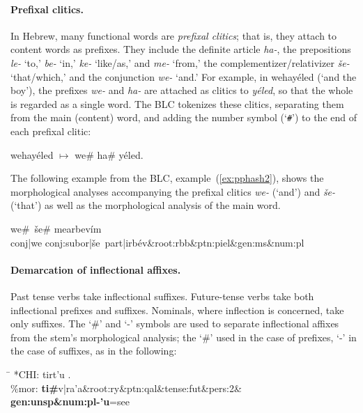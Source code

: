 \paragraph{Prefixal clitics.} In Hebrew, many functional words are 
\textit{prefixal clitics}; that is, they attach to content 
words as prefixes. They include the definite article \textit{ha-}, the prepositions 
\textit{le-} `to,' \textit{be-} `in,' \textit{ke-} `like/as,' and \textit{me-} 
`from,' the  complementizer/relativizer \textit{\v{s}e-} `that/which,' and the 
conjunction \textit{we-} `and.' For example,  in
\textsf{wehay\'eled} (`and the boy'), the prefixes \textit{we-} and \textit{ha-} 
are attached as clitics to \textit{y\'eled}, 
so that the whole is regarded as a single word. The 
\ac{BLC} tokenizes these clitics, separating them from the 
main (content) word, and adding the number symbol (`\texttt{\#}') to 
the end of each prefixal clitic:
\begin{exe}
\ex  \textsf{wehay\'eled}  \quad $\mapsto$ \quad \textsf{we\# ha\# y\'eled}.
\end{exe}
The following example from the BLC, example~(\ref{ex:pphash2}), shows the morphological analyses accompanying the prefixal clitics \textit{we-} (`and') and \textit{\v{s}e-} (`that') as well as the morphological analysis of the main word.
\begin{exe}
	\ex 
	\textsf{we\#\, \v{s}e\# mearbev\'im} \\  \label{ex:pphash2}
	\textsf{conj|we conj:subor|\v{s}e\, part|irb\'ev\&root:rbb\&ptn:piel\&gen:ms\&num:pl} 
\end{exe}

\paragraph{Demarcation of inflectional affixes.}
Past tense verbs take inflectional suffixes. Future-tense verbs take both inflectional prefixes and suffixes. 
Nominals, where inflection
is concerned, take only suffixes. The `\#' and `-' symbols are used to separate inflectional
affixes from the stem's morphological analysis; the `\#' used in the case of prefixes, `-' in the
case of suffixes, as in the following:

\begin{exe}
\ex \begin{tabbing} \label{ex:pre:v:suf}
\hspace{0.6in} \= \hspace{5.5in} \kill
\textsf{*CHI:} \> \textsf{tirt\a'{u} .} \\
\textsf{\%mor:} \> \textbf{\textsf{ti}\#}\textsf{v|ra\a'{a}\&root:ry\&ptn:qal\&tense:fut\&pers:2\&
\textbf{gen:unsp\&num:pl-\a'{u}}=see}
\end{tabbing}
\end{exe}

